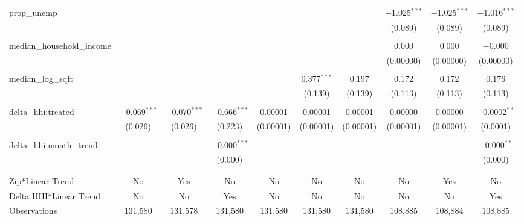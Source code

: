 \begin{table}[H]
{\begin{tabular}{@{\extracolsep{5pt}}lccccccccc}
  prop\_unemp &  &  &  &  &  &  & $-$1.025$^{***}$ & $-$1.025$^{***}$ & $-$1.016$^{***}$ \\  

   &  &  &  &  &  &  & (0.089) & (0.089) & (0.089) \\  

   & & & & & & & & & \\  

  median\_household\_income &  &  &  &  &  &  & 0.000 & 0.000 & $-$0.000 \\  

   &  &  &  &  &  &  & (0.00000) & (0.00000) & (0.00000) \\  

   & & & & & & & & & \\  

  median\_log\_sqft &  &  &  &  & 0.377$^{***}$ & 0.197 & 0.172 & 0.172 & 0.176 \\  

   &  &  &  &  & (0.139) & (0.139) & (0.113) & (0.113) & (0.113) \\  

   & & & & & & & & & \\  

  delta\_hhi:treated & $-$0.069$^{***}$ & $-$0.070$^{***}$ & $-$0.666$^{***}$ & 0.00001 & 0.00001 & 0.00001 & 0.00000 & 0.00000 & $-$0.0002$^{**}$ \\  

   & (0.026) & (0.026) & (0.223) & (0.00001) & (0.00001) & (0.00001) & (0.00001) & (0.00001) & (0.0001) \\  

   & & & & & & & & & \\  

  delta\_hhi:month\_trend &  &  & $-$0.000$^{***}$ &  &  &  &  &  & $-$0.000$^{**}$ \\  

   &  &  & (0.000) &  &  &  &  &  & (0.000) \\  

   & & & & & & & & & \\  

 \hline \\[-1.8ex]  

 Zip*Linear Trend & No & Yes & No & No & No & No & No & Yes & No \\  

 Delta HHI*Linear Trend & No & No & Yes & No & No & No & No & No & Yes \\  

 Observations & 131,580 & 131,578 & 131,580 & 131,580 & 131,580 & 131,580 & 108,885 & 108,884 & 108,885 \\  


\end{tabular}}
\end{table}
